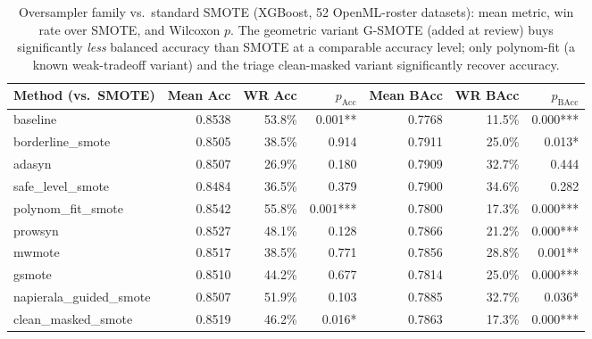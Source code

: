 \begin{table}[t]
\centering
\caption{Oversampler family vs.\ standard SMOTE (XGBoost, 52 OpenML-roster datasets): mean metric, win rate over SMOTE, and Wilcoxon $p$. The geometric variant G-SMOTE (added at review) buys significantly \emph{less} balanced accuracy than SMOTE at a comparable accuracy level; only polynom-fit (a known weak-tradeoff variant) and the triage clean-masked variant significantly recover accuracy.}
\label{tab:smote}
\footnotesize
\setlength{\tabcolsep}{2.5pt}
\begin{tabular}{lrrrrrr}
\toprule
Method (vs.\ SMOTE) & Mean Acc & WR Acc & $p_{\text{Acc}}$ & Mean BAcc & WR BAcc & $p_{\text{BAcc}}$ \\
\midrule
baseline & 0.8538 & 53.8\% & 0.001** & 0.7768 & 11.5\% & 0.000*** \\
borderline\_smote & 0.8505 & 38.5\% & 0.914 & 0.7911 & 25.0\% & 0.013* \\
adasyn & 0.8507 & 26.9\% & 0.180 & 0.7909 & 32.7\% & 0.444 \\
safe\_level\_smote & 0.8484 & 36.5\% & 0.379 & 0.7900 & 34.6\% & 0.282 \\
polynom\_fit\_smote & 0.8542 & 55.8\% & 0.001*** & 0.7800 & 17.3\% & 0.000*** \\
prowsyn & 0.8527 & 48.1\% & 0.128 & 0.7866 & 21.2\% & 0.000*** \\
mwmote & 0.8517 & 38.5\% & 0.771 & 0.7856 & 28.8\% & 0.001** \\
gsmote & 0.8510 & 44.2\% & 0.677 & 0.7814 & 25.0\% & 0.000*** \\
napierala\_guided\_smote & 0.8507 & 51.9\% & 0.103 & 0.7885 & 32.7\% & 0.036* \\
clean\_masked\_smote & 0.8519 & 46.2\% & 0.016* & 0.7863 & 17.3\% & 0.000*** \\
\bottomrule
\end{tabular}
\end{table}
